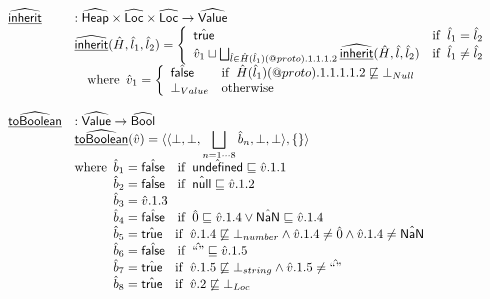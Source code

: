 \documentclass{article}
\makeatletter
\newcommand{\SF}[1]{\mbox{\textsf{#1}}}
\newcommand{\wherec}[1]{{\rm where}\begin{array}[t]{l}#1\end{array}}
\newcommand{\ifc}[1]{{\rm if}\begin{array}[t]{l}#1\end{array}}
\newcommand{\owc}{{\rm otherwise}}
\newcommand{\abs}[1]{\widehat{\SF{#1}}}
\newcommand{\aHeap}{\abs{Heap}}
\newcommand{\aLoc}{\abs{Loc}}
\newcommand{\aValue}{\abs{Value}}
\newcommand{\ahf}[1]{\widehat{\underline{\sf #1}}}
\newcommand{\varprop}[1]{@#1}
\newcommand{\atrue}{\hat{\SF{true}}}
\newcommand{\afalse}{\hat{\SF{false}}}
\newcommand{\aundef}{\hat{\SF{undefined}}}
\newcommand{\anull}{\hat{\SF{null}}}
\makeatother
\begin{document}
\[\begin{array}{ll}
\ahf{inherit} & : \aHeap \times \aLoc \times \aLoc \rightarrow \aValue \\
& \ahf{inherit}(\hat{H},\hat{l}_1,\hat{l}_2)
  = \left\{
    \begin{array}{ll}
      \atrue & \ifc{\hat{l}_1 = \hat{l}_2} \\
      \hat{v}_1 \sqcup \bigsqcup_{\hat{l}\in \hat{H}(\hat{l}_1)(\varprop{proto}).1.1.1.2} \ahf{inherit}(\hat{H},\hat{l},\hat{l}_2) & \ifc{\hat{l}_1 \neq \hat{l}_2} \\
    \end{array}
  \right.\\
& \quad\wherec{
  \hat{v}_1 =
    \left\{
    \begin{array}{ll}
      \afalse & \ifc{\hat{H}(\hat{l}_1)(\varprop{proto}).1.1.1.1.2 \not\sqsubseteq \bot_{Null}}\\
      \bot_{Value} & \owc\\
    \end{array}
    \right.
  }\\
\\
\ahf{toBoolean} & : \aValue \rightarrow \abs{Bool} \\
& \ahf{toBoolean}(\hat{v})
  = \langle\langle \bot,\bot,\displaystyle\bigsqcup_{n=1\cdots8}\hat{b}_n,\bot,\bot\rangle,\{\}\rangle \\
& \wherec{
  \hat{b}_1 = \afalse \quad\ifc{\aundef\sqsubseteq\hat{v}.1.1}\\
  \hat{b}_2 = \afalse \quad\ifc{\anull\sqsubseteq\hat{v}.1.2}\\
  \hat{b}_3 = \hat{v}.1.3 \\
  \hat{b}_4 = \afalse \quad\ifc{\hat{0}\sqsubseteq\hat{v}.1.4\lor\hat{\SF{NaN}}\sqsubseteq\hat{v}.1.4} \\
  \hat{b}_5 = \atrue \quad\ifc{\hat{v}.1.4\not\sqsubseteq\bot_{number}\land\hat{v}.1.4\neq\hat{0}\land\hat{v}.1.4\neq\hat{\SF{NaN}}} \\
  \hat{b}_6 = \afalse \quad\ifc{\hat{``"}\sqsubseteq\hat{v}.1.5} \\
  \hat{b}_7 = \atrue \quad\ifc{\hat{v}.1.5\not\sqsubseteq\bot_{string}\land\hat{v}.1.5\neq\hat{``"}}\\
  \hat{b}_8 = \atrue \quad\ifc{\hat{v}.2\not\sqsubseteq\bot_{Loc}}\\
}\\
\end{array}
\]
\end{document}
